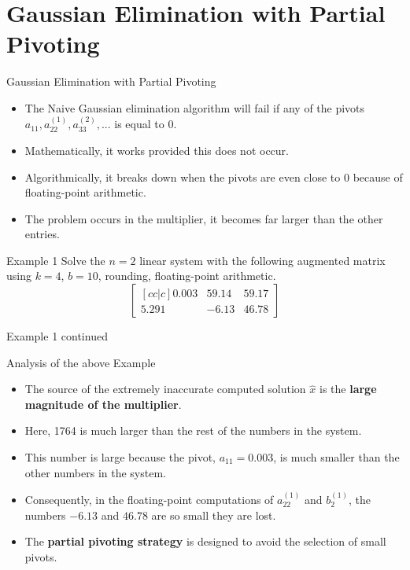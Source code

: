 \documentclass[12pt]{beamer}
\begin{document}
\section{Gaussian Elimination with Partial Pivoting}

\begin{frame}{Gaussian Elimination with Partial Pivoting}

\begin{itemize}

\item{The Naive Gaussian elimination algorithm will fail if any of the pivots $a_{11}, a_{22}^{(1)},a_{33}^{(2)}, ...$ is equal to $0$.}
\item{Mathematically, it works provided this does not occur.}
\item{Algorithmically, it breaks down when the pivots are even close to $0$ because of floating-point arithmetic.}
\item{The problem occurs in the multiplier, it becomes far larger than the other entries.}
\end{itemize}

\end{frame}

\begin{frame}{Example 1}
Solve the $n=2$ linear system with the following augmented matrix using $k=4$, $b=10$, rounding, floating-point arithmetic.
\[
\begin{bmatrix}[cc|c]
	0.003	&	59.14	&	59.17 \\
	5.291		&	-6.13	&	46.78
\end{bmatrix}
\]
\vspace{2 in}
\end{frame}

\begin{frame}{Example 1 continued}

\end{frame}

\begin{frame}{Analysis of the above Example}

\begin{itemize}

\item{The source of the extremely inaccurate computed solution $\hat{x}$ is the {\bf large magnitude of the multiplier}.}
\item{Here, 1764 is much larger than the rest of the numbers in the system.}
\item{This number is large because the pivot, $a_{11}=0.003$, is much smaller than the other numbers in the system.}
\item{Consequently, in the floating-point computations of $a_{22}^{(1)}$ and $b_2^{(1)}$, the numbers $-6.13$ and $46.78$ are so small they are lost.}
\item{The {\bf partial pivoting strategy} is designed to avoid the selection of small pivots.}
\end{itemize}

\end{frame}
\end{document}
